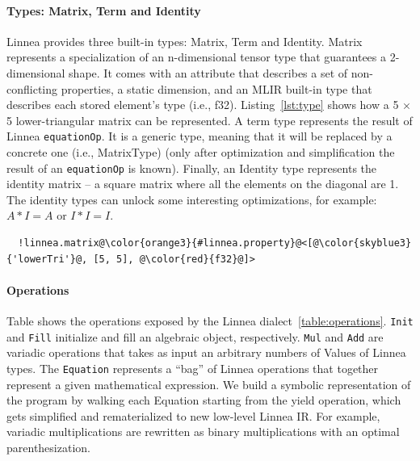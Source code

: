 \documentclass[conference]{IEEEtran}
\begin{document}
\paragraph{Types: Matrix, Term and Identity}

Linnea provides three built-in types: Matrix, Term and Identity. Matrix
represents a specialization of an n-dimensional tensor type that guarantees a
2-dimensional shape. It comes with an attribute that describes a set of
non-conflicting properties, a static dimension, and an MLIR built-in type that
describes each stored element's type (i.e., f32). Listing~\ref{lst:type} shows
how a 5 $\times$ 5 lower-triangular matrix can be represented. A term type
represents the result of Linnea \texttt{equationOp}. It is a generic type,
meaning that it will be replaced by a concrete one (i.e., MatrixType) (only after
optimization and simplification the result of an \texttt{equationOp} is known).
Finally, an Identity type represents the identity matrix -- a square matrix
where all the elements on the diagonal are 1. The identity types can unlock
some interesting optimizations, for example: $A * I = A$ or $I * I = I$.

\begin{listing}[]
\begin{center}
\begin{minipage}[]{0.5\textwidth}
\begin{verbatim}
  !linnea.matrix@\color{orange3}{#linnea.property}@<[@\color{skyblue3}{'lowerTri'}@, [5, 5], @\color{red}{f32}@]>
\end{verbatim}
\end{minipage}
  \caption{A type to represent a 5 $\times$ 5 lower-triangular matrix with \texttt{f32} as element type.}
\label{lst:type}
\end{center}
\end{listing}

\paragraph{Operations}

Table shows the operations exposed by the Linnea
dialect~\ref{table:operations}. \texttt{Init} and \texttt{Fill} initialize and
fill an algebraic object, respectively. \texttt{Mul} and \texttt{Add} are
variadic operations that takes as input an arbitrary numbers of Values of
Linnea types.  The \texttt{Equation} represents a ``bag'' of Linnea operations
that together represent a given mathematical expression. We build a symbolic
representation of the program by walking each Equation starting from the yield
operation, which gets simplified and rematerialized to new low-level Linnea IR.
For example, variadic multiplications are  rewritten as binary multiplications
with an optimal parenthesization. 
\end{document}
